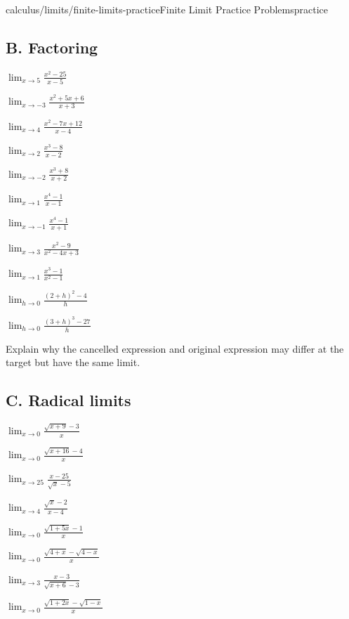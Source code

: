 \begin{webpage}{calculus/limits/finite-limits-practice}{Finite Limit Practice Problems}{practice}
\subsection*{B. Factoring}
\begin{bgexercises}[label=\textbf{2.\arabic*},resume]
  \item \(\displaystyle\lim_{x\to5}\frac{x^2-25}{x-5}\)
  \item \(\displaystyle\lim_{x\to-3}\frac{x^2+5x+6}{x+3}\)
  \item \(\displaystyle\lim_{x\to4}\frac{x^2-7x+12}{x-4}\)
  \item \(\displaystyle\lim_{x\to2}\frac{x^3-8}{x-2}\)
  \item \(\displaystyle\lim_{x\to-2}\frac{x^3+8}{x+2}\)
  \item \(\displaystyle\lim_{x\to1}\frac{x^4-1}{x-1}\)
  \item \(\displaystyle\lim_{x\to-1}\frac{x^4-1}{x+1}\)
  \item \(\displaystyle\lim_{x\to3}\frac{x^2-9}{x^2-4x+3}\)
  \item \(\displaystyle\lim_{x\to1}\frac{x^3-1}{x^2-1}\)
  \item \(\displaystyle\lim_{h\to0}\frac{(2+h)^2-4}{h}\)
  \item \(\displaystyle\lim_{h\to0}\frac{(3+h)^3-27}{h}\)
  \item Explain why the cancelled expression and original expression may differ at the target but have the same limit.
\end{bgexercises}

\subsection*{C. Radical limits}
\begin{bgexercises}[label=\textbf{2.\arabic*},resume]
  \item \(\displaystyle\lim_{x\to0}\frac{\sqrt{x+9}-3}{x}\)
  \item \(\displaystyle\lim_{x\to0}\frac{\sqrt{x+16}-4}{x}\)
  \item \(\displaystyle\lim_{x\to25}\frac{x-25}{\sqrt{x}-5}\)
  \item \(\displaystyle\lim_{x\to4}\frac{\sqrt{x}-2}{x-4}\)
  \item \(\displaystyle\lim_{x\to0}\frac{\sqrt{1+5x}-1}{x}\)
  \item \(\displaystyle\lim_{x\to0}\frac{\sqrt{4+x}-\sqrt{4-x}}{x}\)
  \item \(\displaystyle\lim_{x\to3}\frac{x-3}{\sqrt{x+6}-3}\)
  \item \(\displaystyle\lim_{x\to0}\frac{\sqrt{1+2x}-\sqrt{1-x}}{x}\)
\end{bgexercises}


\end{webpage}
